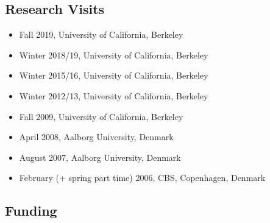 \documentclass[%
    a4paper,
    11pt, %
    headinclude, footexclude,
    notitlepage,
    headsepline,
    pointlessnumbers,
    ]{scrartcl}
\begin{document}
%

\subsection*{Research Visits}

\begin{itemize}
  \item Fall 2019, University of California, Berkeley
  \item Winter 2018/19, University of California, Berkeley
  \item Winter 2015/16, University of California, Berkeley
  \item Winter 2012/13, University of California, Berkeley
  \item Fall 2009, University of California, Berkeley
  \item April 2008, Aalborg University, Denmark
  \item August 2007, Aalborg University, Denmark
  \item February (+ spring part time) 2006, CBS, Copenhagen,
      Denmark
\end{itemize}

\subsection*{Funding}
\end{document}
